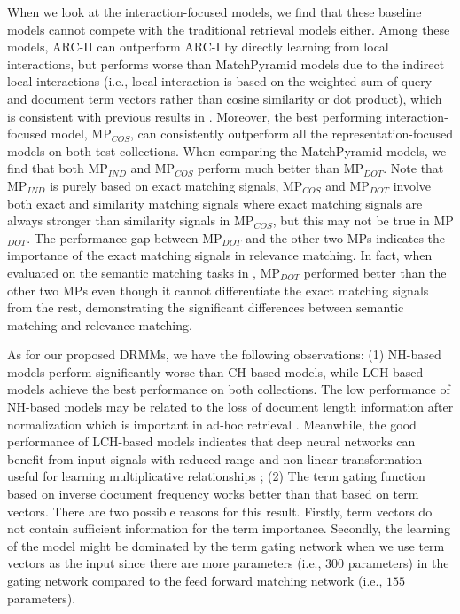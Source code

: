 \documentclass{sig-alternate-05-2015}
\begin{document}
When we look at the interaction-focused models, we find that these baseline models cannot compete with the traditional retrieval models either. Among these models, ARC-II can outperform ARC-I by directly learning from local interactions, but performs worse than MatchPyramid models due to the indirect local interactions (i.e., local interaction is based on the weighted sum of query and document term vectors rather than cosine similarity or dot product), which is consistent with previous results in \cite{hu2014convolutional,pang2016text}. Moreover, the best performing interaction-focused model, MP$_{COS}$, can consistently outperform all the representation-focused models on both test collections. When comparing the MatchPyramid models, we find that both MP$_{IND}$ and MP$_{COS}$ perform much better than MP$_{DOT}$. Note that MP$_{IND}$ is purely based on exact matching signals, MP$_{COS}$ and MP$_{DOT}$ involve both exact and similarity matching signals where exact matching signals are always stronger than similarity signals in MP$_{COS}$, but this may not be true in MP$_{DOT}$. The performance gap between MP$_{DOT}$ and the other two MPs indicates the importance of the exact matching signals in relevance matching. In fact, when evaluated on the semantic matching tasks in \cite{pang2016text}, MP$_{DOT}$ performed better than the other two MPs even though it cannot differentiate the exact matching signals from the rest, demonstrating the significant differences between semantic matching and relevance matching.

As for our proposed DRMMs, we have the following observations: (1) NH-based models perform significantly worse than CH-based models, while LCH-based models achieve the best performance on both collections. The low performance of NH-based models may be related to the loss of document length information after normalization which is important in ad-hoc retrieval \cite{fang2011diagnostic}. Meanwhile, the good performance of LCH-based models indicates that deep neural networks can benefit from input signals with reduced range and non-linear transformation useful for learning multiplicative relationships \cite{burges2005learning}; (2) The term gating function based on inverse document frequency works better than that based on term vectors. There are two possible reasons for this result. Firstly, term vectors do not contain sufficient information for the term importance. Secondly, the learning of the model might be dominated by the term gating network when we use term vectors as the input since there are more parameters (i.e., $300$ parameters) in the gating network compared to the feed forward matching network (i.e., $155$ parameters). 
\end{document}
